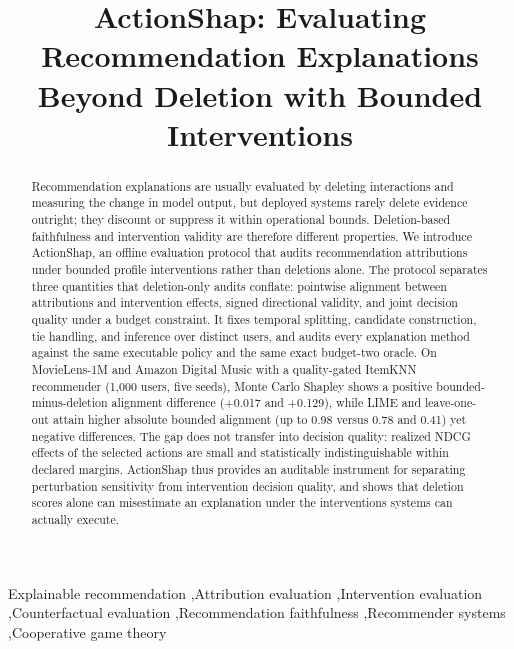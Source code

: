 \documentclass[a4paper,fleqn,doubleblind]{cas-sc}
\begin{document}
\let\WriteBookmarks\relax

\shortauthors{}

\title[mode = title]{ActionShap: Evaluating Recommendation Explanations Beyond Deletion with Bounded Interventions}


\begin{abstract}
Recommendation explanations are usually evaluated by deleting interactions and measuring the change in model output, but deployed systems rarely delete evidence outright; they discount or suppress it within operational bounds. Deletion-based faithfulness and intervention validity are therefore different properties. We introduce ActionShap, an offline evaluation protocol that audits recommendation attributions under bounded profile interventions rather than deletions alone. The protocol separates three quantities that deletion-only audits conflate: pointwise alignment between attributions and intervention effects, signed directional validity, and joint decision quality under a budget constraint. It fixes temporal splitting, candidate construction, tie handling, and inference over distinct users, and audits every explanation method against the same executable policy and the same exact budget-two oracle. On MovieLens-1M and Amazon Digital Music with a quality-gated ItemKNN recommender (1,000 users, five seeds), Monte Carlo Shapley shows a positive bounded-minus-deletion alignment difference (+0.017 and +0.129), while LIME and leave-one-out attain higher absolute bounded alignment (up to 0.98 versus 0.78 and 0.41) yet negative differences. The gap does not transfer into decision quality: realized NDCG effects of the selected actions are small and statistically indistinguishable within declared margins. ActionShap thus provides an auditable instrument for separating perturbation sensitivity from intervention decision quality, and shows that deletion scores alone can misestimate an explanation under the interventions systems can actually execute.
\end{abstract}

\begin{keywords}
Explainable recommendation \sep Attribution evaluation \sep Intervention evaluation \sep Counterfactual evaluation \sep Recommendation faithfulness \sep Recommender systems \sep Cooperative game theory
\end{keywords}
\end{document}
